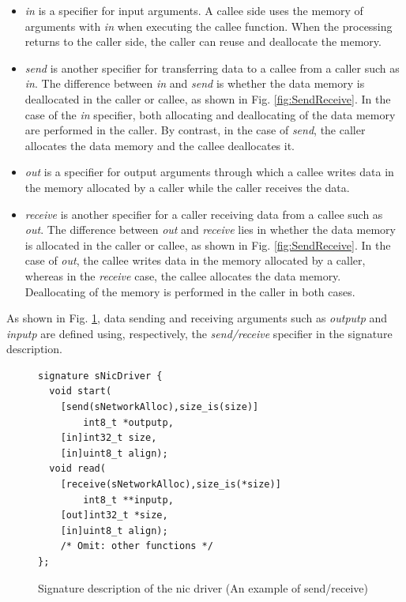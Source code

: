 \documentclass[conference]{IEEEtran/IEEEtran}
\begin{document}
\begin{itemize}
\item {\it in} is a specifier for input arguments.
A callee side uses the memory of arguments with {\it in} when executing the callee function.
When the processing returns to the caller side, the caller can reuse and deallocate the memory.

\item {\it send} is another specifier for transferring data to a callee from a caller such as {\it in}.
The difference between {\it in} and {\it send} is whether the data memory is deallocated in the caller or callee, as shown in Fig. \ref{fig:SendReceive}.
In the case of the {\it in} specifier, both allocating and deallocating of the data memory are performed in the caller.
By contrast, in the case of {\it send}, the caller allocates the data memory and the callee deallocates it.

\item {\it out} is a specifier for output arguments through which a callee writes data in the memory allocated by a caller while the caller receives the data.

\item {\it receive} is another specifier for a caller receiving data from a callee such as {\it out}.
The difference between {\it out} and {\it receive} lies in whether the data memory is allocated in the caller or callee, as shown in Fig. \ref{fig:SendReceive}.
In the case of {\it out}, the callee writes data in the memory allocated by a caller, whereas in the {\it receive} case, the callee allocates the data memory.
Deallocating of the memory is performed in the caller in both cases.
\end{itemize}

As shown in Fig. \ref{src:SendReceive}, data sending and receiving arguments such as {\it outputp} and {\it inputp} are defined using, respectively, the {\it send/receive} specifier in the signature description.

\begin{figure}[t]
\centering
\begin{lstlisting}
signature sNicDriver {
  void start(
    [send(sNetworkAlloc),size_is(size)]
        int8_t *outputp,
    [in]int32_t size,
    [in]uint8_t align);
  void read(
    [receive(sNetworkAlloc),size_is(*size)]
        int8_t **inputp,
    [out]int32_t *size,
    [in]uint8_t align);
    /* Omit: other functions */
};
\end{lstlisting}
\vspace{-1mm} \caption{Signature description of the nic driver (An example of send/receive)}
\vspace{-1mm} \label{src:SendReceive}
\end{figure}
\end{document}
